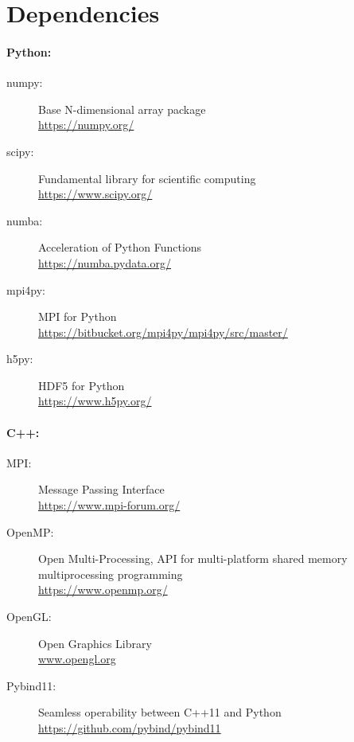 \section{Dependencies}
% 
\paragraph{Python:}
\begin{description}
\item[numpy:] Base N-dimensional array package \cite{2019arXiv190710121V}\\
\url{https://numpy.org/}
\item[scipy:] Fundamental library for scientific computing \cite{2019arXiv190710121V}\\
\url{https://www.scipy.org/} 
\item[numba:] Acceleration of Python Functions \cite{Lam2015}\\
\url{https://numba.pydata.org/}
\item[mpi4py:] MPI for Python \cite{Dalcn2005, Dalcn2008, Dalcin2011}\\
\url{https://bitbucket.org/mpi4py/mpi4py/src/master/}
\item[h5py:] HDF5 for Python \cite{collette_python_hdf5_2014, hdf5}\\
\url{https://www.h5py.org/}
\end{description}
% 
\paragraph{C++:}
\begin{description}
\item[MPI:] Message Passing Interface \cite{message2015mpi}\\
\url{https://www.mpi-forum.org/}
\item[OpenMP:] Open Multi-Processing, API for multi-platform shared memory multiprocessing programming \cite{dagum1998openmp}\\
\url{https://www.openmp.org/}
\item[OpenGL:] Open Graphics Library \cite{khronos}\\
\url{www.opengl.org}
\item[Pybind11:] Seamless operability between C++11 and Python \cite{pybind11}\\ \url{https://github.com/pybind/pybind11} 
\end{description}
%